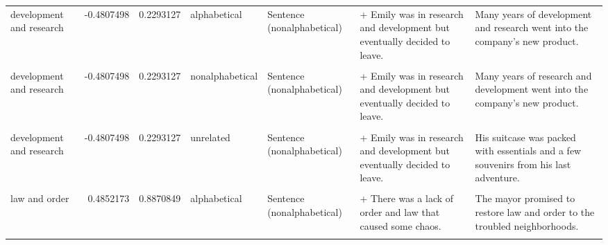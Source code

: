 \documentclass[
  12pt,
]{scrartcl}
\begin{document}
\begin{landscape}
\begin{longtable}{lrrllll}
development and research & -0.4807498 & 0.2293127 & alphabetical & Sentence (nonalphabetical) & + Emily was in research and development but eventually decided to leave. & Many years of development and research went into the company's new product.\\
\cellcolor{gray!6}{development and research} & \cellcolor{gray!6}{-0.4807498} & \cellcolor{gray!6}{0.2293127} & \cellcolor{gray!6}{nonalphabetical} & \cellcolor{gray!6}{Sentence (alphabetical)} & \cellcolor{gray!6}{+ Emily was in development and research but eventually decided to leave.} & \cellcolor{gray!6}{Many years of research and development went into the company's new product.}\\
development and research & -0.4807498 & 0.2293127 & nonalphabetical & Sentence (nonalphabetical) & + Emily was in research and development but eventually decided to leave. & Many years of research and development went into the company's new product.\\
\addlinespace
\cellcolor{gray!6}{development and research} & \cellcolor{gray!6}{-0.4807498} & \cellcolor{gray!6}{0.2293127} & \cellcolor{gray!6}{unrelated} & \cellcolor{gray!6}{Sentence (alphabetical)} & \cellcolor{gray!6}{+ Emily was in development and research but eventually decided to leave.} & \cellcolor{gray!6}{His suitcase was packed with essentials and a few souvenirs from his last adventure.}\\
development and research & -0.4807498 & 0.2293127 & unrelated & Sentence (nonalphabetical) & + Emily was in research and development but eventually decided to leave. & His suitcase was packed with essentials and a few souvenirs from his last adventure.\\
\cellcolor{gray!6}{law and order} & \cellcolor{gray!6}{0.4852173} & \cellcolor{gray!6}{0.8870849} & \cellcolor{gray!6}{alphabetical} & \cellcolor{gray!6}{Sentence (alphabetical)} & \cellcolor{gray!6}{+ There was a lack of law and order that caused some chaos.} & \cellcolor{gray!6}{The mayor promised to restore law and order to the troubled neighborhoods.}\\
law and order & 0.4852173 & 0.8870849 & alphabetical & Sentence (nonalphabetical) & + There was a lack of order and law that caused some chaos. & The mayor promised to restore law and order to the troubled neighborhoods.\\
\cellcolor{gray!6}{law and order} & \cellcolor{gray!6}{0.4852173} & \cellcolor{gray!6}{0.8870849} & \cellcolor{gray!6}{nonalphabetical} & \cellcolor{gray!6}{Sentence (alphabetical)} & \cellcolor{gray!6}{+ There was a lack of law and order that caused some chaos.} & \cellcolor{gray!6}{The mayor promised to restore order and law to the troubled neighborhoods.}\\

\end{longtable}
\end{landscape}
\end{document}
